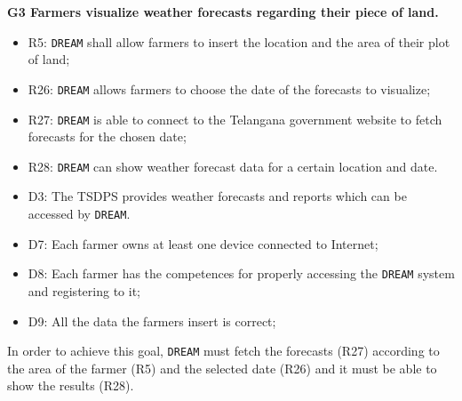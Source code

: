 \documentclass{article}
\begin{document}
\textbf{G3 Farmers visualize weather forecasts regarding their piece of land.}
\begin{itemize}
    \item R5: \verb|DREAM| shall allow farmers to insert the location and the area of their plot of land;

    \item R26: \verb|DREAM| allows farmers to choose the date of the forecasts to visualize;
  
    \item R27: \verb|DREAM| is able to connect to the Telangana government website to fetch forecasts for the chosen date;
  
    \item R28: \verb|DREAM| can show weather forecast data for a certain location and date.
    
    \item D3: The TSDPS provides weather forecasts and reports which can be accessed by \verb|DREAM|.
    
    \item D7: Each farmer owns at least one device connected to Internet;
    
    \item D8: Each farmer has the competences for properly accessing the \verb|DREAM| system and registering to it;
    
    \item D9: All the data the farmers insert is correct;
\end{itemize}
In order to achieve this goal, \verb|DREAM| must fetch the forecasts (R27) according to the area of the farmer (R5) and the selected date (R26) and it must be able to show the results (R28).
\end{document}
